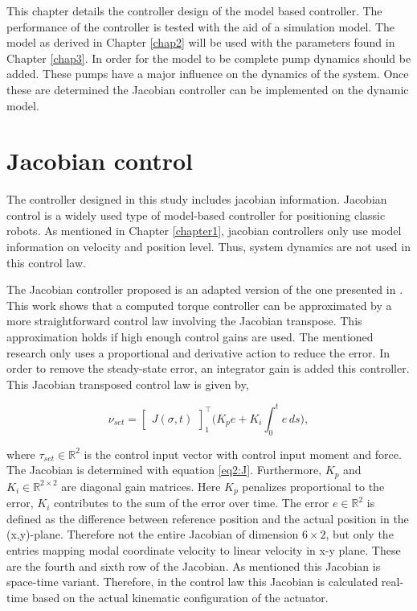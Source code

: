 \label{chap4}

This chapter details the controller design of the model based controller. The performance of the controller is tested with the aid of a simulation model. The model as derived in Chapter \ref{chap2} will be used with the parameters found in Chapter \ref{chap3}. In order for the model to be complete pump dynamics should be added. These pumps have a major influence on the dynamics of the system. Once these are determined the Jacobian controller can be implemented on the dynamic model. 


\section{Jacobian control}


The controller designed in this study includes jacobian information. Jacobian control is a widely used type of model-based controller for positioning classic robots. As mentioned in Chapter \ref{chapter1}, jacobian controllers only use model information on velocity and position level. Thus, system dynamics are not used in this control law.


The Jacobian controller proposed is an adapted version of the one presented in \cite{MOOSAVIAN20071226}. This work shows that a computed torque controller can be approximated by a more straightforward control law involving the Jacobian transpose. This approximation holds if high enough control gains are used. The mentioned research only uses a proportional and derivative action to reduce the error. In order to remove the steady-state error, an integrator gain is added this controller. This Jacobian transposed control law is given by,


\begin{equation}
    \nu_{set} = \begin{bmatrix}J(\sigma,t)\end{bmatrix}_1^\top \Big(K_p e + K_i \int_0^t e \hspace{2pt} ds \Big), 
    \label{eq:tau}
\end{equation}

where $\tau_{set} \in \mathbb{R}^2$ is the control input vector with control input moment and force. The Jacobian is determined with equation \ref{eq2:J}. Furthermore, $K_p$ and $K_i \in \mathbb{R}^{2\times 2}$ are diagonal gain matrices. Here $K_p$ penalizes proportional to the error, $K_i$ contributes to the sum of the error over time. The error $e \in \mathbb{R}^2$ is defined as the difference between reference position and the actual position in the (x,y)-plane. Therefore not the entire Jacobian of dimension $6 \times 2$, but only the entries mapping modal coordinate velocity to linear velocity in x-y plane. These are the fourth and sixth row of the Jacobian. As mentioned this Jacobian is space-time variant. Therefore, in the control law this Jacobian is calculated real-time based on the actual kinematic configuration of the actuator. 

